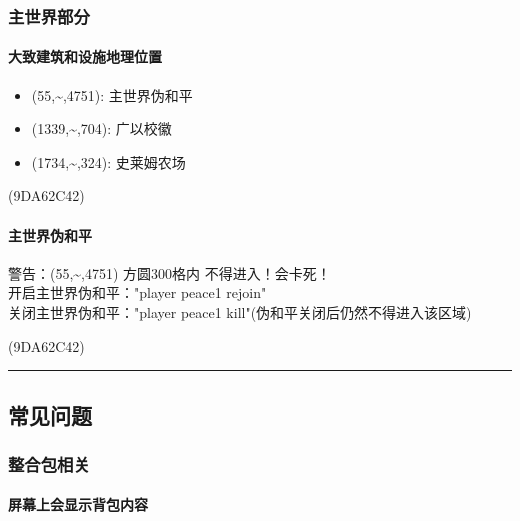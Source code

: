 \documentclass[
]{article}
\providecommand{\tightlist}{%
  \setlength{\itemsep}{0pt}\setlength{\parskip}{0pt}}
\begin{document}
\subsubsection{主世界部分}\label{section-28}

\paragraph{大致建筑和设施地理位置}\label{section-29}

\begin{itemize}
\tightlist
\item
  (55,\textasciitilde,4751): 主世界伪和平
\item
  (1339,\textasciitilde,704): 广以校徽
\item
  (1734,\textasciitilde,324): 史莱姆农场
\end{itemize}

\begin{flushright}(9DA62C42)\end{flushright}

\paragraph{主世界伪和平}\label{section-30}

警告：(55,\textasciitilde,4751) 方圆300格内 不得进入！会卡死！\\
开启主世界伪和平："player peace1 rejoin"\\
关闭主世界伪和平："player peace1 kill"(伪和平关闭后仍然不得进入该区域)

\begin{flushright}(9DA62C42)\end{flushright}

\begin{center}\rule{0.5\linewidth}{0.5pt}\end{center}

\subsection{常见问题}\label{section-31}

\subsubsection{整合包相关}\label{section-32}

\paragraph{屏幕上会显示背包内容}\label{section-33}
\end{document}
